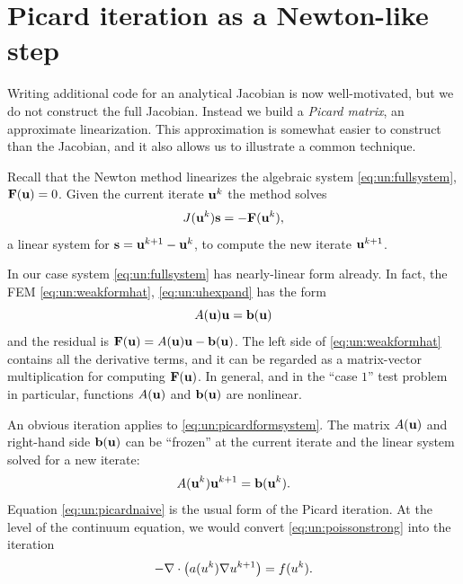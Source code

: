 \section{Picard iteration as a Newton-like step}

Writing additional code for an analytical Jacobian is now well-motivated, but we do not construct the full Jacobian.  Instead we build a \emph{Picard matrix}, an approximate linearization.  This approximation is somewhat easier to construct than the Jacobian, and it also allows us to illustrate a common technique.

Recall that the Newton method linearizes the algebraic system \eqref{eq:un:fullsystem}, $\mathbf{F}(\mathbf{u})=0$.  Given the current iterate $\mathbf{u}^k$ the method solves
\begin{equation}
J(\mathbf{u}^k) \mathbf{s} = -\mathbf{F}(\mathbf{u}^k),  \label{eq:un:newtonstep}
\end{equation}
a linear system for $\mathbf{s} = \mathbf{u}^{k+1}-\mathbf{u}^k$, to compute the new iterate $\mathbf{u}^{k+1}$.

In our case system \eqref{eq:un:fullsystem} has nearly-linear form already.  In fact, the FEM \eqref{eq:un:weakformhat}, \eqref{eq:un:uhexpand} has the form
\begin{equation}
A(\mathbf{u}) \mathbf{u} = \mathbf{b}(\mathbf{u}) \label{eq:un:picardformsystem}
\end{equation}
and the residual is $\mathbf{F}(\mathbf{u}) = A(\mathbf{u}) \mathbf{u} - \mathbf{b}(\mathbf{u})$.  The left side of \eqref{eq:un:weakformhat} contains all the derivative terms, and it can be regarded as a matrix-vector multiplication for computing $\mathbf{F}(\mathbf{u})$.  In general, and in the ``case $1$'' test problem in particular, functions $A(\mathbf{u})$ and $\mathbf{b}(\mathbf{u})$ are nonlinear.

An obvious iteration applies to \eqref{eq:un:picardformsystem}.  The matrix $A(\mathbf{u})$ and right-hand side $\mathbf{b}(\mathbf{u})$ can be ``frozen'' at the current iterate and the linear system solved for a new iterate:
\begin{equation}
A(\mathbf{u}^k) \mathbf{u}^{k+1} = \mathbf{b}(\mathbf{u}^k). \label{eq:un:picardnaive}
\end{equation}
Equation \eqref{eq:un:picardnaive} is the usual form of the Picard iteration.  At the level of the continuum equation, we would convert \eqref{eq:un:poissonstrong} into the iteration
    $$-\nabla\cdot\left(a(u^k) \nabla u^{k+1}\right) = f(u^k).$$

